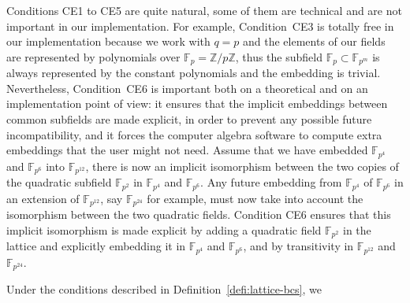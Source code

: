 Conditions CE1 to CE5 are quite natural, some of them are technical and
are not important in our implementation. For example, Condition~CE3
is totally free in our implementation because we work with $q=p$ and the
elements of our fields are represented by polynomials over
$\mathbb{F}_p=\mathbb{Z}/p\mathbb{Z}$, thus the subfield
$\mathbb{F}_p\subset\mathbb{F}_{p^m}$ is always represented by the constant
polynomials and the embedding is trivial. Nevertheless, Condition~CE6 is
important both on a theoretical and on an implementation point of view: it
ensures that the implicit embeddings between common subfields are made explicit,
in order to prevent any possible future incompatibility, and it forces the
computer algebra software to compute extra embeddings that the user might not
need. Assume that we have embedded $\mathbb{F}_{p^4}$ and $\mathbb{F}_{p^6}$
into $\mathbb{F}_{p^{12}}$, there is now an implicit isomorphism between the two
copies of the quadratic subfield $\mathbb{F}_{p^2}$ in $\mathbb{F}_{p^4}$ and
$\mathbb{F}_{p^6}$. Any future embedding from $\mathbb{F}_{p^4}$ of
$\mathbb{F}_{p^6}$ in an extension of
$\mathbb{F}_{p^{12}}$, say $\mathbb{F}_{p^{24}}$ for example, must now take into
account the isomorphism between the two quadratic fields. Condition CE6 ensures
that this implicit isomorphism is made explicit by adding a quadratic field
$\mathbb{F}_{p^2}$ in the lattice and explicitly embedding it in
$\mathbb{F}_{p^4}$ and $\mathbb{F}_{p^6}$, and by transitivity in
$\mathbb{F}_{p^{12}}$ and $\mathbb{F}_{p^{24}}$.
\begin{center}
\end{center}
Under the conditions described in Definition~\ref{defi:lattice-bcs}, we
